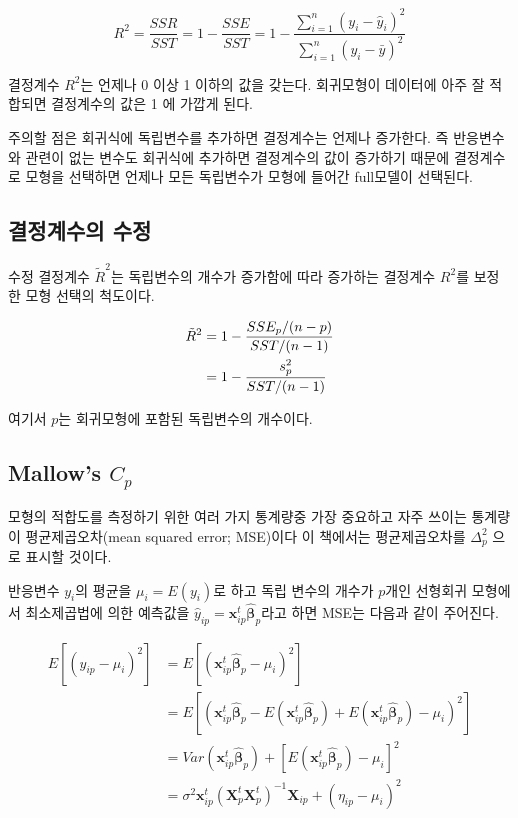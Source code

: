 \documentclass[
  10pt,
]{book}
\theoremstyle{definition}
\theoremstyle{definition}
\theoremstyle{definition}
\theoremstyle{definition}
\theoremstyle{remark}
\begin{document}
\begin{equation}
 R^2 = \frac{SSR}{SST} =  1 -\frac{SSE}{SST}  =1- \frac{\sum^n_{i=1}(y_i-\hat y_i)^2}{ \sum^n_{i=1}(y_i - \bar y)^2} 
 \label{eq:selr2}
\end{equation}

결정계수 \(R^2\)는 언제나 0 이상 1 이하의 값을 갖는다. 회귀모형이 데이터에 아주 잘 적합되면 결정계수의 값은 1 에 가깝게 된다.

주의할 점은 회귀식에 독립변수를 추가하면 결정계수는 언제나 증가한다. 즉 반응변수와 관련이 없는 변수도 회귀식에 추가하면 결정계수의 값이 증가하기 때문에 결정계수로 모형을 선택하면 언제나 모든 독립변수가 모형에 들어간 full모델이 선택된다.

\hypertarget{uxacb0uxc815uxacc4uxc218uxc758-uxc218uxc815}{%
\subsection{결정계수의 수정}\label{uxacb0uxc815uxacc4uxc218uxc758-uxc218uxc815}}

수정 결정계수 \(\tilde R^2\)는 독립변수의 개수가 증가함에 따라 증가하는 결정계수 \(R^2\)를 보정한 모형 선택의 척도이다.

\begin{align}
 \tilde R^2 & = 1-  \frac{SSE_p/(n-p)}{SST/(n-1)} \\ \notag 
  & = 1 - \frac{s_p^2}{SST/(n-1)}  
  \label{eq:seladjr2}
\end{align}

여기서 \(p\)는 회귀모형에 포함된 독립변수의 개수이다.

\hypertarget{mallows-c_p}{%
\subsection{\texorpdfstring{Mallow's \(C_p\)}{Mallow's C\_p}}\label{mallows-c_p}}

모형의 적합도를 측정하기 위한 여러 가지 통계량중 가장 중요하고 자주 쓰이는 통계량이 평균제곱오차(mean squared error; MSE)이다 이 책에서는 평균제곱오차를 \(\Delta_p^2\) 으로 표시할 것이다.

반응변수 \(y_i\)의 평균을 \(\mu_i=E(y_i)\)로 하고 독립 변수의 개수가 \(p\)개인 선형회귀 모형에서 최소제곱법에 의한 예측값을
\(\hat y_{ip} = {\bm x}_{ip}^t \hat {\bm \beta}_p\)라고 하면 MSE는 다음과 같이 주어진다.

\begin{align*}
E [ (\hat y_{ip} -\mu_i)^2 ] &= E[( {\bm x}_{ip}^t \hat {\bm \beta}_p-\mu_i)^2 ] \\
  &=  E[( {\bm x}_{ip}^t \hat {\bm \beta}_p -E({\bm x}_{ip}^t \hat {\bm \beta}_p) + E({\bm x}_{ip}^t \hat {\bm \beta}_p)-\mu_i)^2 ] \\
  &= Var({\bm x}_{ip}^t \hat {\bm \beta}_p)+ [E({\bm x}_{ip}^t \hat {\bm \beta}_p)-\mu_i]^2 \\
  &= \sigma^2 {\bm x}_{ip}^t({\bm X}_p^t {\bm X}_p^t)^{-1} {\bm X}_{ip} + ( \eta_{ip}-\mu_i)^2
\end{align*}
\end{document}
